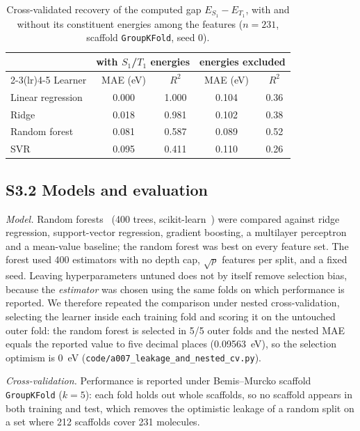 \documentclass[twoside,twocolumn,9pt]{extarticle}
\begin{document}
\begin{table}[htbp]
  \centering
  \caption{Cross-validated recovery of the computed gap $E_{S_1}-E_{T_1}$, with and
    without its constituent energies among the features ($n = \num{231}$, scaffold
    \texttt{GroupKFold}, seed \num{0}).}
  \label{tab:leakage}
  \begin{tabular}{lcccc}
    \toprule
    & \multicolumn{2}{c}{with $S_1$/$T_1$ energies} & \multicolumn{2}{c}{energies excluded} \\
    \cmidrule(lr){2-3}\cmidrule(lr){4-5}
    Learner & MAE (eV) & $R^2$ & MAE (eV) & $R^2$ \\
    \midrule
    Linear regression & 0.000 & 1.000 & 0.104 & 0.36 \\
    Ridge             & 0.018 & 0.981 & 0.102 & 0.38 \\
    Random forest     & 0.081 & 0.587 & 0.089 & 0.52 \\
    SVR               & 0.095 & 0.411 & 0.110 & 0.26 \\
    \bottomrule
  \end{tabular}
\end{table}

\subsection*{S3.2 Models and evaluation}
\emph{Model.} Random forests~\cite{Breiman2001} (\num{400} trees,
scikit-learn~\cite{Pedregosa2011}) were compared against ridge regression,
support-vector regression, gradient boosting, a multilayer perceptron and a mean-value
baseline; the random forest was best on every feature set. The forest used \num{400}
estimators with no depth cap, $\sqrt{p}$ features per split, and a fixed seed.
Leaving hyperparameters untuned does not by itself remove selection bias, because the
\emph{estimator} was chosen using the same folds on which performance is reported. We
therefore repeated the comparison under nested cross-validation, selecting the learner
inside each training fold and scoring it on the untouched outer fold: the random forest
is selected in \num{5}/\num{5} outer folds and the nested MAE equals the reported value
to five decimal places (\qty{0.09563}{\electronvolt}), so the selection optimism is
\qty{0}{\electronvolt} (\texttt{code/a007\_leakage\_and\_nested\_cv.py}).

\emph{Cross-validation.} Performance is reported under Bemis--Murcko scaffold
\texttt{GroupKFold} ($k=5$): each fold holds out whole scaffolds, so no scaffold
appears in both training and test, which removes the optimistic leakage of a
random split on a set where \num{212} scaffolds cover \num{231} molecules.
\end{document}
